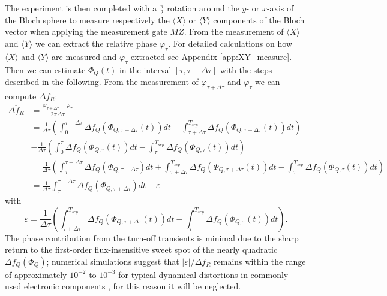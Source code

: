 The experiment is then completed with a $\frac{\pi}{2}$ rotation around the $y$- or $x$-axis of the Bloch sphere to measure respectively the $\langle X \rangle$ or $\langle Y \rangle$ components of the Bloch vector when applying the measurement gate $MZ$. 
From the measurement of $\langle X \rangle$ and $\langle Y \rangle$ we can extract the relative phase $\varphi_{\tau}$.
For detailed calculations on how $\langle X \rangle$ and $\langle Y \rangle$ are measured and $\varphi_{\tau}$ extracted see Appendix \ref{app:XY_measure}. \\ 

Then we can estimate $\Phi_Q(t)$ in the interval $[\tau,\tau+\Delta\tau]$ with the steps described in the following.
From the measurement of $\varphi_{\tau + \Delta\tau}$ and $\varphi_\tau$ we can compute $\overline{\Delta f_R}$:
\begin{align}\label{eq:detuning}
    \overline{\Delta f_R} &= \frac{\varphi_{\tau+\Delta\tau} - \varphi_\tau}{2\pi\Delta\tau}\\ 
    &= \frac{1}{\Delta\tau}\left(\int_{0}^{\tau+\Delta\tau}\Delta f_Q (\Phi_{Q,\tau+\Delta\tau}(t))dt + \int_{\tau+\Delta\tau}^{T_{sep}}\Delta f_Q (\Phi_{Q,\tau+\Delta\tau}(t))dt\right) \\
    &-\frac{1}{\Delta\tau}\left(\int_{0}^{\tau}\Delta f_Q (\Phi_{Q,\tau}(t))dt - \int_{\tau}^{T_{sep}}\Delta f_Q (\Phi_{Q,\tau}(t))dt\right)\\
    &=\frac{1}{\Delta\tau}\left(\int_{\tau}^{\tau+\Delta\tau} \Delta f_Q(\Phi_{Q,\tau+\Delta\tau})dt + \int_{\tau+\Delta\tau}^{T_{sep}}\Delta f_Q (\Phi_{Q,\tau+\Delta\tau}(t))dt - \int_{\tau}^{T_{sep}}\Delta f_Q (\Phi_{Q,\tau}(t))dt\right)\\
    &= \frac{1}{\Delta\tau}\int_{\tau}^{\tau+\Delta\tau} \Delta f_Q(\Phi_{Q,\tau+\Delta\tau})dt + \varepsilon
\end{align}  
with \[\varepsilon = \frac{1}{\Delta\tau}\left(\int_{\tau+\Delta\tau}^{T_{sep}}\Delta f_Q (\Phi_{Q,\tau+\Delta\tau}(t))dt - \int_{\tau}^{T_{sep}}\Delta f_Q (\Phi_{Q,\tau}(t))dt\right).\]
The phase contribution from the turn-off transients is minimal due to the sharp return to the first-order flux-insensitive sweet spot of the nearly quadratic $\Delta f_Q(\Phi_Q)$; 
numerical simulations suggest that $|\varepsilon|/\Delta f_R$ remains within the range of approximately $10^{-2}$ to $10^{-3}$ for typical dynamical distortions in commonly used electronic components \cite{negligible} \cite{Langford2017}, for this reason it will be neglected.\\

